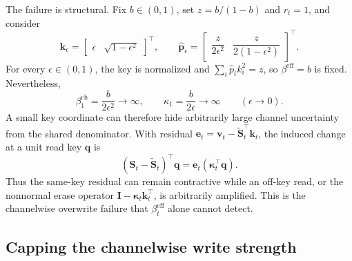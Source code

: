 \documentclass[11pt]{article}
\newcommand{\vct}[1]{\boldsymbol{#1}}
\begin{document}
The failure is structural. Fix $b\in(0,1)$, set $z=b/(1-b)$ and $r_t=1$, and consider
\begin{equation}
  \vct{k}_\epsilon
  =\begin{bmatrix}\epsilon&\sqrt{1-\epsilon^2}\end{bmatrix}^{\!\top},
  \qquad
  \widehat{\vct{p}}_\epsilon
  =\begin{bmatrix}
      \dfrac{z}{2\epsilon^2}&\dfrac{z}{2(1-\epsilon^2)}
    \end{bmatrix}^{\!\top}.
  \label{eq:discussion-unbounded-channel-construction}
\end{equation}
For every $\epsilon\in(0,1)$, the key is normalized and
$\sum_i\widehat p_i k_i^2=z$, so $\beta^{\mathrm{eff}}=b$ is fixed. Nevertheless,
\begin{equation}
  \beta_1^{\mathrm{ch}}=\frac{b}{2\epsilon^2}\longrightarrow\infty,
  \qquad
  \kappa_1=\frac{b}{2\epsilon}\longrightarrow\infty
  \qquad(\epsilon\to0).
  \label{eq:discussion-unbounded-channel-limit}
\end{equation}
A small key coordinate can therefore hide arbitrarily large channel uncertainty from the shared
denominator. With residual
$\vct{e}_t=\vct{v}_t-\widetilde{\vct{S}}_t^\top\vct{k}_t$, the induced change at a unit read key
$\vct{q}$ is
\begin{equation}
  (\vct{S}_t-\widetilde{\vct{S}}_t)^\top\vct{q}
  =\vct{e}_t(\vct{\kappa}_t^\top\vct{q}).
  \label{eq:discussion-cross-key-overwrite}
\end{equation}
Thus the same-key residual can remain contractive while an off-key read, or the nonnormal erase
operator $\vct{I}-\vct{\kappa}_t\vct{k}_t^\top$, is arbitrarily amplified. This is the
channelwise overwrite failure that $\beta_t^{\mathrm{eff}}$ alone cannot detect.

\subsection{Capping the channelwise write strength}
\end{document}

